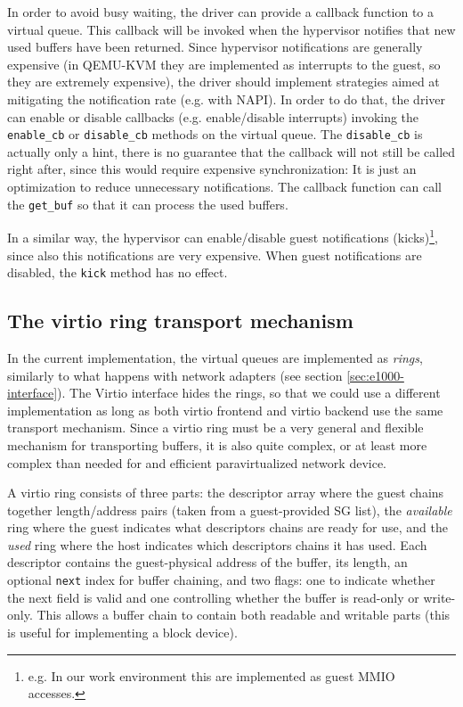 \vspace{0.5cm}

In order to avoid busy waiting, the driver can provide a callback function to a virtual queue. This callback will be invoked when the
hypervisor notifies that new used buffers have been returned. Since hypervisor notifications are generally expensive (in QEMU-KVM they are 
implemented as interrupts to the guest, so they are extremely expensive), the driver should implement strategies aimed at mitigating the
notification rate (e.g. with NAPI). In order to do that, the driver can enable or disable callbacks (e.g. enable/disable interrupts) 
invoking the \texttt{enable\_cb} or \texttt{disable\_cb} methods on the virtual queue. The \texttt{disable\_cb} is actually only a hint,
there is no guarantee that the callback will not still be called right after, since this would require expensive synchronization: It is
just an optimization to reduce unnecessary notifications.
The callback function can call the \texttt{get\_buf} so that it can process the used buffers.

\vspace{0.5cm}

In a similar way, the hypervisor can enable/disable guest notifications (kicks)\footnote{e.g. In our work environment this are
implemented as guest MMIO accesses.}, since also this notifications are very expensive. When guest notifications are disabled,
the \texttt{kick} method has no effect.


\subsection{The virtio ring transport mechanism}
In the current implementation, the virtual queues are implemented as \emph{rings}, similarly to what happens with network adapters (see
section \ref{sec:e1000-interface}). The Virtio interface hides the rings, so that we could use a different implementation as
long as both virtio frontend and virtio backend use the same transport mechanism.
Since a virtio ring must be a very general and flexible mechanism for transporting buffers, it is also quite complex, or at least more
complex than needed for and efficient paravirtualized network device.

\vspace{0.5cm}

A virtio ring consists of three parts: the descriptor array where the guest chains together length/address pairs (taken from a guest-provided
SG list), the \emph{available} ring where the guest indicates what descriptors chains are ready for use, and the \emph{used} ring where the
host indicates which descriptors chains it has used. Each descriptor contains the guest-physical address of the buffer, its length, an 
optional \texttt{next} index for buffer chaining, and two flags: one to indicate whether the next field is valid and one controlling 
whether the buffer is read-only or write-only. This allows a buffer chain to contain both readable and writable parts (this is 
useful for implementing a block device).

